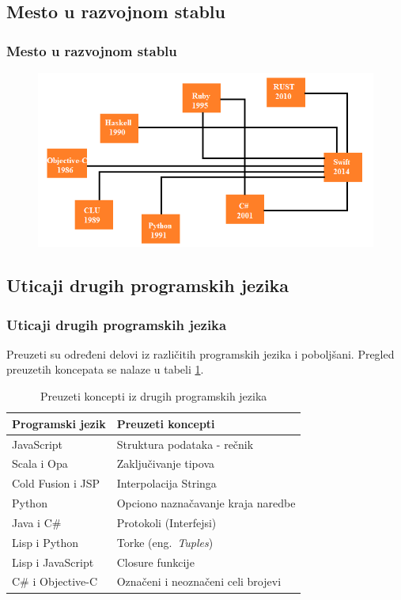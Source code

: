 \documentclass{beamer}
\begin{document}
\subsection{Mesto u razvojnom stablu}
\begin{frame}
\frametitle{ Mesto u razvojnom stablu}

\begin{figure}[h!]
\begin{center}
\includegraphics[scale=0.5]{razvojno_stablo.png}
\end{center}
\label{fig:razvojno_stablo}
\end{figure}

\end{frame}
\subsection{Uticaji drugih programskih jezika}
\begin{frame}
\frametitle{Uticaji drugih programskih jezika}
Preuzeti su određeni delovi iz različitih programskih jezika i poboljšani. Pregled preuzetih koncepata se nalaze u tabeli \ref{tab:koncepti}.

\begin{table}[h!]
\begin{center}
\caption{Preuzeti koncepti iz drugih programskih jezika}
\begin{tabular}{|l|l|} \hline
\label{tab:koncepti}
\textbf{Programski jezik} & \textbf{Preuzeti koncepti} \\ \hline
JavaScript & Struktura podataka - rečnik  \\ \hline
Scala i Opa & Zaključivanje tipova \\ \hline
Cold Fusion i JSP & Interpolacija Stringa \\ \hline
Python & Opciono naznačavanje kraja naredbe \\ \hline
Java i C\# & Protokoli (Interfejsi) \\ \hline
Lisp i Python & Torke (eng.~{\em Tuples}) \\ \hline
Lisp i JavaScript &  Closure funkcije \\ \hline
C\# i Objective-C & Označeni i neoznačeni celi brojevi \\ \hline
\end{tabular}
\end{center}
\end{table}
\end{frame}
\end{document}
